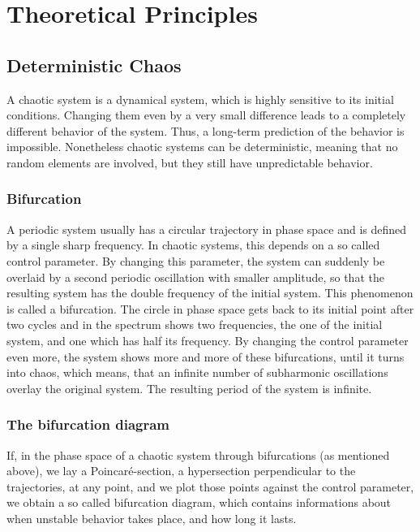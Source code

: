 \section{Theoretical Principles}

\subsection{Deterministic Chaos}

A chaotic system is a dynamical system, which is highly sensitive to its initial conditions. Changing them even by a very small difference leads to a completely different behavior of the system. Thus, a long-term prediction of the behavior is impossible. Nonetheless chaotic systems can be deterministic, meaning that no random elements are involved, but they still have unpredictable behavior.

\subsubsection{Bifurcation}

A periodic system usually has a circular trajectory in phase space and is defined by a single sharp frequency. In chaotic systems, this depends on a so called control parameter. By changing this parameter, the system can suddenly be overlaid by a second periodic oscillation with smaller amplitude, so that the resulting system has the double frequency of the initial system. This phenomenon is called a bifurcation. The circle in phase space gets back to its initial point after two cycles and in the spectrum shows two frequencies, the one of the initial system, and one which has half its frequency. By changing the control parameter even more, the system shows more and more of these bifurcations, until it turns into chaos, which means, that an infinite number of subharmonic oscillations overlay the original system. The resulting period of the system is infinite.

\subsubsection{The bifurcation diagram}

If, in the phase space of a chaotic system through bifurcations (as mentioned above), we lay a Poincaré-section, a hypersection perpendicular to the trajectories, at any point, and we plot those points against the control parameter, we obtain a so called bifurcation diagram, which contains informations about when unstable behavior takes place, and how long it lasts.

